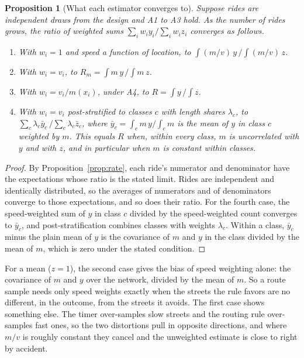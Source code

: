 \documentclass[11pt]{article}
\newtheorem{proposition}{Proposition}
\begin{document}
\begin{proposition}[What each estimator converges to]
\label{prop:limits}
Suppose rides are independent draws from the design and A1 to A3 hold. As the number of rides grows, the ratio of weighted sums $\sum_i w_i y_i / \sum_i w_i z_i$ converges as follows.
\begin{enumerate}
\item With $w_i = 1$ and speed a function of location, to $\int (m/v)\, y \,/ \int (m/v)\, z$.
\item With $w_i = v_i$, to $R_m = \int m\, y \,/ \int m\, z$.
\item With $w_i = v_i / m(x_i)$, under A4, to $R = \int y \,/ \int z$.
\item With $w_i = v_i$ post-stratified to classes $c$ with length shares $\lambda_c$, to $\sum_c \lambda_c \bar{y}_c \,/ \sum_c \lambda_c \bar{z}_c$, where $\bar{y}_c = \int_c m\, y / \int_c m$ is the mean of $y$ in class $c$ weighted by $m$. This equals $R$ when, within every class, $m$ is uncorrelated with $y$ and with $z$, and in particular when $m$ is constant within classes.
\end{enumerate}
\end{proposition}

\begin{proof}
By Proposition~\ref{prop:rate}, each ride's numerator and denominator have the expectations whose ratio is the stated limit. Rides are independent and identically distributed, so the averages of numerators and of denominators converge to those expectations, and so does their ratio. For the fourth case, the speed-weighted sum of $y$ in class $c$ divided by the speed-weighted count converges to $\bar{y}_c$, and post-stratification combines classes with weights $\lambda_c$. Within a class, $\bar{y}_c$ minus the plain mean of $y$ is the covariance of $m$ and $y$ in the class divided by the mean of $m$, which is zero under the stated condition.
\end{proof}

For a mean ($z = 1$), the second case gives the bias of speed weighting alone: the covariance of $m$ and $y$ over the network, divided by the mean of $m$. So a route sample needs only speed weights exactly when the streets the rule favors are no different, in the outcome, from the streets it avoids. The first case shows something else. The timer over-samples slow streets and the routing rule over-samples fast ones, so the two distortions pull in opposite directions, and where $m/v$ is roughly constant they cancel and the unweighted estimate is close to right by accident.
\end{document}
